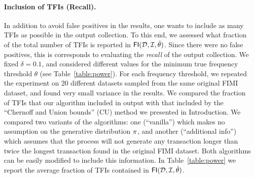 \paragraph*{Inclusion of TFIs (Recall).}
In addition to avoid false positives in the results, one wants to include as many TFIs
as possible in the output collection. To this end, we assessed what fraction of
the total number of TFIs is reported in $\mathsf{FI}({\cal D},{\cal I},\hat\theta)$. Since there
were no false positives, this is corresponds to evaluating the \emph{recall} of
the output collection. We fixed $\delta=0.1$, and considered different values
for the minimum true frequency threshold $\theta$ (see Table~\ref{table:power}).
For each frequency threshold, we repeated the experiment on 20 different
datasets sampled from the same original FIMI dataset, %
and found very small variance in the results.  %
We compared the fraction of TFIs that our algorithm included in output with that
included by the ``Chernoff and Union bounds'' (CU) method we presented in
Introduction. We compared two variants of the algorithms: one
(``vanilla'') which makes no assumption on the generative distribution $\pi$,
and another (``additional info'') which assumes that the process will not
generate any transaction longer than twice the longest transaction found in the
original FIMI dataset. Both algorithms can be easily modified to include this
information. In Table~\ref{table:power} we report the average fraction of TFIs
contained in $\mathsf{FI}({\cal D},{\cal I},\hat\theta)$. 
